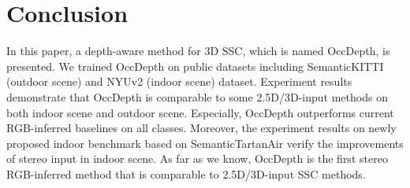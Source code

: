 \documentclass{article}
\begin{document}
	\section{Conclusion}
	In this paper, a depth-aware method for 3D SSC, which is named OccDepth, is presented.  We trained OccDepth on public datasets including SemanticKITTI (outdoor scene) and NYUv2 (indoor scene) dataset. Experiment results demonstrate that OccDepth is comparable to some 2.5D/3D-input methods on both indoor scene and outdoor scene. Especially, OccDepth outperforms current RGB-inferred baselines on all classes. Moreover, the experiment results on newly proposed indoor benchmark based on SemanticTartanAir verify the improvements of stereo input in indoor scene. As far as we know, OccDepth is the first stereo RGB-inferred method that is comparable to 2.5D/3D-input SSC methods.

	
	
\end{document}
